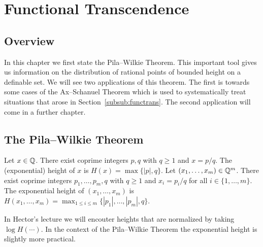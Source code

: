 \chapter{Functional Transcendence}

\section{Overview}

In this chapter we first state the Pila--Wilkie Theorem. This
important tool gives us information on the distribution of rational
points of bounded height on a definable set. We will see two
applications of this theorem. The first is towards some cases of the
Ax--Schanuel Theorem which is used to systematically treat situations
that arose in Section~\ref{subsub:functrans}. The second application
will come in a further chapter. 

\section{The Pila--Wilkie Theorem}


\begin{definition}
  Let $x\in {\mathbb{Q}}$. There exist coprime integers $p,q$ with
  $q\ge 1$ and $x=p/q$. The (exponential) height of $x$ is $H(x)=\max\{|p|,q\}$.
  Let $(x_1,\ldots,x_m)\in{\mathbb{Q}}^m$. There exist coprime integers
  $p_1,\ldots,p_m,q$ with $q\ge 1$ and $x_i = p_i/q$ for all $i\in
  \{1,\ldots,m\}$.
  The exponential height of $(x_1,\ldots,x_m)$ is $H(x_1,\ldots,x_m)
  = \max_{1\le i\le m} \{|p_1|,\ldots,|p_m|,q\}$.
\end{definition}

In Hector's lecture we will encouter heights that are normalized by
taking $\log H(\cdots)$. In the context of the
Pila--Wilkie Theorem the exponential height is slightly more
practical.


